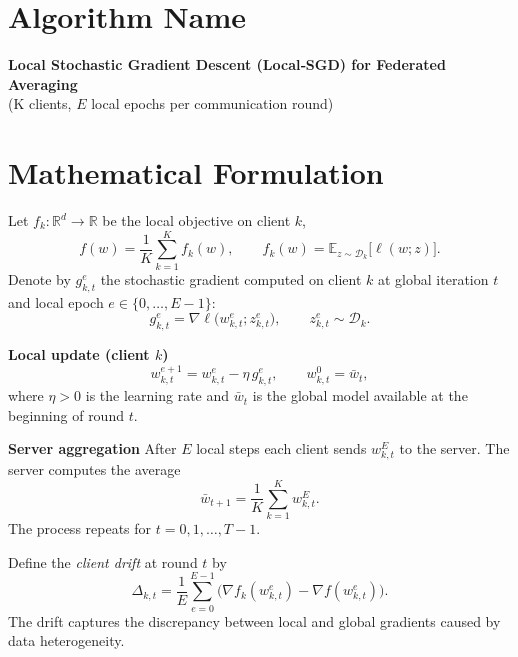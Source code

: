 \documentclass{article}
\newcommand{\E}{\mathbb{E}}
\newcommand{\R}{\mathbb{R}}
\begin{document}
\section*{Algorithm Name}
\textbf{Local Stochastic Gradient Descent (Local‑SGD) for Federated Averaging}\\
(K clients, $E$ local epochs per communication round)

\section*{Mathematical Formulation}
Let $f_k:\R^d\!\to\!\R$ be the local objective on client $k$,
\[
f(w)=\frac1K\sum_{k=1}^{K}f_k(w),\qquad 
f_k(w)=\E_{z\sim\mathcal{D}_k}\big[\ell(w;z)\big].
\]
Denote by $g_{k,t}^e$ the stochastic gradient computed on client $k$ at
global iteration $t$ and local epoch $e\in\{0,\dots,E-1\}$:
\[
g_{k,t}^e = \nabla \ell\big(w_{k,t}^e;z_{k,t}^e\big),
\qquad 
z_{k,t}^e\sim\mathcal{D}_k .
\]

\noindent\textbf{Local update (client $k$)}  
\begin{equation}\label{eq:local-update}
w_{k,t}^{e+1}=w_{k,t}^{e}-\eta\, g_{k,t}^{e},
\qquad 
w_{k,t}^{0}= \bar w_t,
\end{equation}
where $\eta>0$ is the learning rate and $\bar w_t$ is the global model
available at the beginning of round $t$.

\noindent\textbf{Server aggregation}  
After $E$ local steps each client sends $w_{k,t}^{E}$ to the server.
The server computes the average
\begin{equation}\label{eq:aggregation}
\bar w_{t+1}= \frac1K\sum_{k=1}^{K} w_{k,t}^{E}.
\end{equation}
The process repeats for $t=0,1,\dots,T-1$.

Define the \emph{client drift} at round $t$ by
\[
\Delta_{k,t}= \frac1E\sum_{e=0}^{E-1}\bigl(\nabla f_k(w_{k,t}^{e})-\nabla f(w_{k,t}^{e})\bigr).
\]
The drift captures the discrepancy between local and global gradients
caused by data heterogeneity.
\end{document}
